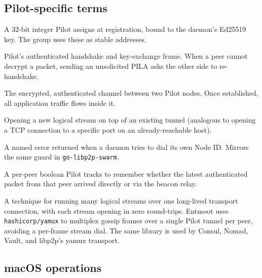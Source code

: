 \documentclass[11pt,a4paper]{article}
\begin{document}
\subsection*{Pilot-specific terms}

\begin{description}[leftmargin=1em,style=nextline]
    \item[\textbf{Node ID.}]
    A 32-bit integer Pilot assigns at registration, bound to the
    daemon's Ed25519 key. The group uses these as stable
    addresses.
    \item[\textbf{PILA.}]
    Pilot's authenticated handshake and key-exchange frame. When
    a peer cannot decrypt a packet, sending an unsolicited PILA
    asks the other side to re-handshake.
    \item[\textbf{Tunnel.}]
    The encrypted, authenticated channel between two Pilot
    nodes. Once established, all application traffic flows
    inside it.
    \item[\textbf{Stream dial.}]
    Opening a new logical stream on top of an existing tunnel
    (analogous to opening a TCP connection to a specific port
    on an already-reachable host).
    \item[\textbf{\texttt{ErrDialToSelf}.}]
    A named error returned when a daemon tries to dial its own
    Node ID. Mirrors the same guard in \texttt{go-libp2p-swarm}.
    \item[\textbf{\texttt{viaRelay}.}]
    A per-peer boolean Pilot tracks to remember whether the
    latest authenticated packet from that peer arrived directly
    or via the beacon relay.
    \item[\textbf{Stream multiplexing (yamux).}]
    A technique for running many logical streams over one
    long-lived transport connection, with each stream opening
    in zero round-trips. Entmoot uses
    \texttt{hashicorp/yamux} to multiplex gossip frames over a
    single Pilot tunnel per peer, avoiding a per-frame stream
    dial. The same library is used by Consul, Nomad, Vault,
    and libp2p's yamux transport.
\end{description}

\subsection*{macOS operations}
\end{document}
